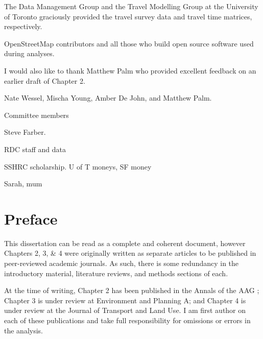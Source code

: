 \documentclass[11 pt, letterpaper]{report}
\begin{document}





The Data Management Group and the Travel Modelling Group at the University of Toronto graciously provided the travel survey data and travel time matrices, respectively. 

OpenStreetMap contributors and all those who build open source software used during analyses.

I would also like to thank Matthew Palm who provided excellent feedback on an earlier draft of Chapter 2.

Nate Wessel, Mischa Young, Amber De John, and Matthew Palm. 

Committee members

Steve Farber.

RDC staff and data

SSHRC scholarship. U of T moneys, SF money

Sarah, mum


\newpage





\tableofcontents


\newpage







\listoffigures

\newpage



\listoftables



\newpage


\chapter*{Preface}


This dissertation can be read as a complete and coherent document, however Chapters 2, 3, \& 4 were originally written as separate articles to be published in peer-reviewed academic journals. As such, there is some redundancy in the introductory material, literature reviews, and methods sections of each. 

At the time of writing, Chapter 2 has been published in the Annals of the AAG \cite{allen_suburbanization_2021}; Chapter 3 is under review at Environment and Planning A; and Chapter 4 is under review at the Journal of Transport and Land Use. I am first author on each of these publications and take full responsibility for omissions or errors in the analysis. 
\end{document}
